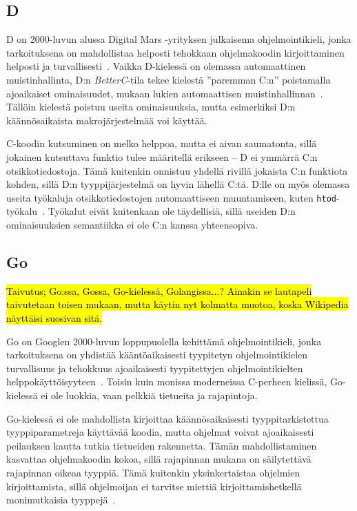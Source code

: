 \subsection{D}

D on 2000-luvun alussa Digital Mars -yrityksen julkaisema ohjelmointikieli,
jonka tarkoituksena on mahdollistaa helposti tehokkaan ohjelmakoodin
kirjoittaminen helposti ja turvallisesti~\citep{dhistory}. Vaikka D-kielessä on
olemassa automaattinen muistinhallinta, D:n \emph{BetterC}-tila tekee kielestä
''paremman C:n'' poistamalla ajoaikaiset ominaisuudet, mukaan lukien
automaattisen muistinhallinnan~\citep{dbetterc}. Tällöin kielestä poistuu
useita ominaisuuksia, mutta esimerkiksi D:n käännösaikaista makrojärjestelmää
voi käyttää.

C-koodin kutsuminen on melko helppoa, mutta ei aivan saumatonta, sillä jokainen
kutsuttava funktio tulee määritellä erikseen -- D ei ymmärrä C:n
otsikkotiedostoja. Tämä kuitenkin onnistuu yhdellä rivillä jokaista C:n
funktiota kohden, sillä D:n tyyppijärjestelmä on hyvin lähellä C:tä. D:lle on
myös olemassa useita työkaluja otsikkotiedostojen automaattiseen muuntamiseen,
kuten \texttt{htod}-työkalu~\citep{htod}. Työkalut eivät kuitenkaan ole
täydellisiä, sillä useiden D:n ominaisuuksien semantiikka ei ole C:n kanssa
yhteensopiva.

\subsection{Go}

\hl{Taivutus; Go:ssa, Gossa, Go-kielessä, Golangissa...? Ainakin se lautapeli
taivutetaan toisen mukaan, mutta käytin nyt kolmatta muotoa, koska Wikipedia
näyttäisi suosivan sitä.}

Go on Googlen 2000-luvun loppupuolella kehittämä ohjelmointikieli, jonka
tarkoituksena on yhdistää kääntöaikaisesti tyypitetyn ohjelmointikielen
turvallisuus ja tehokkuus ajoaikaisesti tyypitettyjen ohjelmointikielten
helppokäyttöisyyteen~\citep{gohistory}. Toisin kuin monissa moderneissa
C-perheen kielissä, Go-kielessä ei ole luokkia, vaan pelkkiä tietueita ja
rajapintoja.

Go-kielessä ei ole mahdollista kirjoittaa käännösaikaisesti tyyppitarkistettua
tyyppiparametreja käyttävää koodia, mutta ohjelmat voivat ajoaikaisesti
peilauksen kautta tutkia tietueiden rakennetta.
Tämän mahdollistaminen kasvattaa ohjelmakoodin kokoa, sillä rajapinnan mukana
on säilytettävä rajapinnan oikeaa tyyppiä. Tämä kuitenkin yksinkertaistaa
ohjelmien kirjoittamista, sillä ohjelmoijan ei tarvitse miettiä
kirjoittamishetkellä monimutkaisia tyyppejä~\citep[esim.][kalvo 8]{gohistory}.

